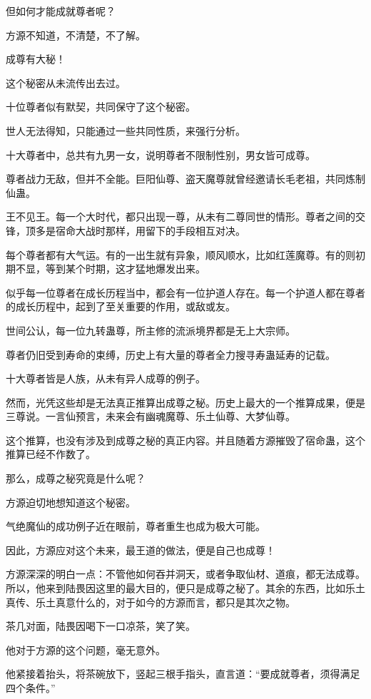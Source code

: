 \begin{this_body}
但如何才能成就尊者呢？

方源不知道，不清楚，不了解。

成尊有大秘！

这个秘密从未流传出去过。

十位尊者似有默契，共同保守了这个秘密。

世人无法得知，只能通过一些共同性质，来强行分析。

十大尊者中，总共有九男一女，说明尊者不限制性别，男女皆可成尊。

尊者战力无敌，但并不全能。巨阳仙尊、盗天魔尊就曾经邀请长毛老祖，共同炼制仙蛊。

王不见王。每一个大时代，都只出现一尊，从未有二尊同世的情形。尊者之间的交锋，顶多是宿命大战时那样，用留下的手段相互对决。

每个尊者都有大气运。有的一出生就有异象，顺风顺水，比如红莲魔尊。有的则初期不显，等到某个时期，这才猛地爆发出来。

似乎每一位尊者在成长历程当中，都会有一位护道人存在。每一个护道人都在尊者的成长历程中，起到了至关重要的作用，或敌或友。

世间公认，每一位九转蛊尊，所主修的流派境界都是无上大宗师。

尊者仍旧受到寿命的束缚，历史上有大量的尊者全力搜寻寿蛊延寿的记载。

十大尊者皆是人族，从未有异人成尊的例子。

然而，光凭这些却是无法真正推算出成尊之秘。历史上最大的一个推算成果，便是三尊说。一言仙预言，未来会有幽魂魔尊、乐土仙尊、大梦仙尊。

这个推算，也没有涉及到成尊之秘的真正内容。并且随着方源摧毁了宿命蛊，这个推算已经不作数了。

那么，成尊之秘究竟是什么呢？

方源迫切地想知道这个秘密。

气绝魔仙的成功例子近在眼前，尊者重生也成为极大可能。

因此，方源应对这个未来，最王道的做法，便是自己也成尊！

方源深深的明白一点：不管他如何吞并洞天，或者争取仙材、道痕，都无法成尊。所以，他来到陆畏因这里的最大目的，便只是成尊之秘了。其余的东西，比如乐土真传、乐土真意什么的，对于如今的方源而言，都只是其次之物。

茶几对面，陆畏因喝下一口凉茶，笑了笑。

他对于方源的这个问题，毫无意外。

他紧接着抬头，将茶碗放下，竖起三根手指头，直言道：“要成就尊者，须得满足四个条件。”


\end{this_body}

